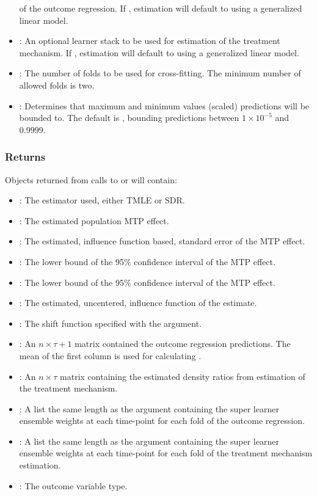 \documentclass[]{jss}
\begin{document}
\begin{itemize}
  of the outcome regression. If , estimation will default to using a generalized linear model.
  \item {}: An optional  learner stack to be used for estimation
  of the treatment mechanism. If , estimation will default to using a generalized linear model.
  \item {}: The number of folds to be used for cross-fitting. The minimum number of allowed folds is two.
  \item {}: Determines that maximum and minimum values (scaled) predictions will be
  bounded to. The default is , bounding predictions between \(1\times10^{-5}\) and \(0.9999\).
  
\end{itemize}

\subsubsection{Returns}

Objects returned from calls to  or  will contain:

\begin{itemize}

  \item {}: The estimator used, either TMLE or SDR.
  \item {}: The estimated population MTP effect.
  \item {}: The estimated, influence function based, standard error of
  the MTP effect.
  \item {}: The lower bound of the 95\% confidence interval of the MTP effect.
  \item {}: The lower bound of the 95\% confidence interval of the MTP effect.
  \item {}: The estimated, uncentered, influence function of the estimate.
  \item {}: The shift function specified with the  argument.
  \item {}: An \(n \times \tau + 1\) matrix contained the outcome regression
  predictions. The mean of the first column is used for calculating .
  \item {}: An \(n \times \tau\) matrix containing the estimated density
  ratios from estimation of the treatment mechanism.
  \item {}: A list the same length as the  argument containing the
  super learner ensemble weights at each time-point for each fold of the outcome regression.
  \item {}: A list the same length as the  argument containing the
  super learner ensemble weights at each time-point for each fold of the treatment mechanism
  estimation.
  \item {}: The outcome variable type.
  
\end{itemize}
\end{document}
